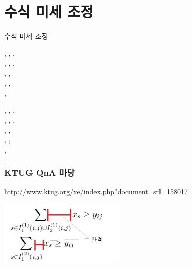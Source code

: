 \documentclass{beamer}
\begin{document}
\section{수식 미세 조정}

\begin{frame}
\huge
\centering 수식 미세 조정
\end{frame}

\begin{frame}
\LARGE
\begin{center}
\texttt{\string\mathllap}, 
\texttt{\string\mathclap}, 
\texttt{\string\mathrlap}, \\ 
\texttt{\string\clap}, 
\texttt{\string\mathmbox}, 
\texttt{\string\mathmakebox}, \\ 
\texttt{\string\cramped}, 
\texttt{\string\crampedllap}, \\
\texttt{\string\crampedclap}, 
\texttt{\string\crampedrlap}, \\
\texttt{\string\smashoperator},
\texttt{\string\adjustlimits}
\end{center}
\end{frame}

\begin{frame}
\LARGE
\begin{center}
\textcolor{lightgray}{\texttt{\string\mathllap}}, 
\alert{\texttt{\string\mathclap}}, 
\textcolor{lightgray}{\texttt{\string\mathrlap}}, \\ 
\textcolor{lightgray}{\texttt{\string\clap}}, 
\textcolor{lightgray}{\texttt{\string\mathmbox}}, 
\textcolor{lightgray}{\texttt{\string\mathmakebox}}, \\ 
\textcolor{lightgray}{\texttt{\string\cramped}}, 
\textcolor{lightgray}{\texttt{\string\crampedllap}}, \\
\textcolor{lightgray}{\texttt{\string\crampedclap}}, 
\textcolor{lightgray}{\texttt{\string\crampedrlap}}, \\
\alert{\texttt{\string\smashoperator}},
\alert{\texttt{\string\adjustlimits}}
\end{center}
\end{frame}

\begin{frame}
\frametitle{KTUG QnA 마당}
\url{http://www.ktug.org/xe/index.php?document_srl=158017}

\medskip
{}

\smallskip
\begin{center}
\includegraphics[width=6cm]{mathclap}
\end{center}
\end{frame}
\end{document}
